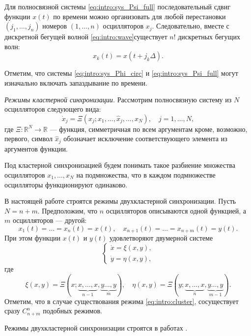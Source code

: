 Для полносвязной системы \eqref{eq:intro:sys_Psi_full} последовательный сдвиг функции $x(t)$ по времени можно организовать для любой перестановки $(j_1,\ldots,j_n)$ номеров $(1,\ldots,n)$ осцилляторов $x_j$.
Следовательно, вместе с дискретной бегущей волной \eqref{eq:intro:wave}существует $n!$ дискретных бегущих волн:
\begin{equation}
	\label{wave_full}
	x_k(t) = x(t + j_k\Delta).
\end{equation}

Отметим, что системы \eqref{eq:intro:sys_Phi_circ} и \eqref{eq:intro:sys_Psi_full} могут изначально включать запаздывание по времени.

\textit{Режимы кластерной синхронизации.} 
Рассмотрим полносвязную систему из $N$ осцилляторов следующего вида:
\[\dot{x}_j
=\Xi(x_j;x_1,\ldots,\hat{x}_j,\ldots,x_{N}),\quad j=1,\ldots,N,\]
где $\Xi:\mathbb{R}^{N}\to\mathbb{R}$ --- функция, симметричная по всем аргументам кроме, возможно, первого, символ $\hat{x}_j$ обозначает исключение соответствующего элемента из аргументов функции.

Под кластерной синхронизацией будем понимать такое разбиение множества осцилляторов $x_1,\ldots,x_{N}$ на подмножества, что в каждом подмножестве осцилляторы функционируют одинаково.

В настоящей работе строятся режимы двухкластерной синхронизации. Пусть $N = n + m$. Предположим, что $n$ осцилляторов описываются одной функцией, а $m$ осцилляторов --- другой:
\begin{equation}
	\label{eq:intro:cluster}
	x_1(t)=\ldots=x_n(t)=x(t),\quad x_{n+1}(t)=\ldots=x_{n+m}(t)=y(t).
\end{equation}
При этом функции $x(t)$ и $y(t)$ удовлетворяют двумерной системе
\[
\begin{cases}
	\dot{x}=\xi(x,y),\\
	\dot{y}=\eta(x,y),
\end{cases}
\]
где 
\[
\xi(x,y)=\Xi(x;\underbrace{x,\ldots,x}_{n-1},\underbrace{y\ldots,y}_{m}),\quad
\eta(x,y)=\Xi(y;\underbrace{x,\ldots,x}_{n},\underbrace{y\ldots,y}_{m-1}).
\]
Отметим, что в случае существования режима \eqref{eq:intro:cluster}, сосуществует сразу $C_{n+m}^n$ подобных режимов.

Режимы двухкластерной синхронизации строятся в работах \cite{Glyzin2016a, Glyzin2022}.

\bigskip

